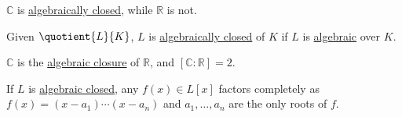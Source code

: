 \begin{eg}
	\(\mathbb{C} \) is \hyperref[def:algebraically-closed]{algebraically closed}, while \(\mathbb{R} \) is not.
\end{eg}

Given \(\quotient{L}{K} \), \(L\) is \hyperref[def:algebraically-closed]{algebraically closed} of \(K\) if \(L\) is \hyperref[def:algebraic-extension]{algebraic} over \(K\).

\begin{eg}
	\(\mathbb{C} \) is the \hyperref[def:algebraically-closed]{algebraic closure} of \(\mathbb{R} \), and \([\mathbb{C} \colon \mathbb{R} ] = 2\).
\end{eg}


If \(L\) is \hyperref[def:algebraically-closed]{algebraic closed}, any \(f(x) \in L[x]\) factors completely as \(f(x) = (x-a_1)\cdots (x-a_n)\) and \(a_1, \ldots , a_n\) are the only roots of \(f\).


